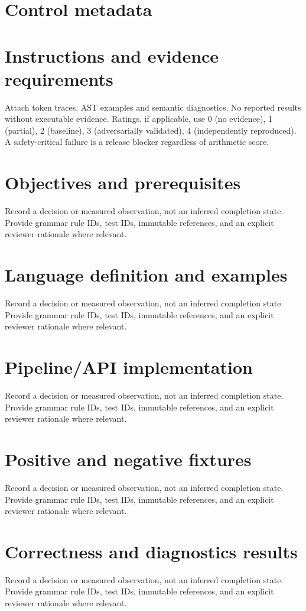 \documentclass[11pt,letterpaper]{article}
\begin{document}
\makedoctitle\makedocsummary
\tableofcontents\clearpage
\section{Control metadata}
\section{Instructions and evidence requirements}
Attach token traces, AST examples and semantic diagnostics. No reported results without executable evidence. Ratings, if applicable, use 0 (no evidence), 1 (partial), 2 (baseline), 3 (adversarially validated), 4 (independently reproduced). A safety-critical failure is a release blocker regardless of arithmetic score.
\section{Objectives and prerequisites}
Record a decision or measured observation, not an inferred completion state. Provide grammar rule IDs, test IDs, immutable references, and an explicit reviewer rationale where relevant.
\section{Language definition and examples}
Record a decision or measured observation, not an inferred completion state. Provide grammar rule IDs, test IDs, immutable references, and an explicit reviewer rationale where relevant.
\section{Pipeline/API implementation}
Record a decision or measured observation, not an inferred completion state. Provide grammar rule IDs, test IDs, immutable references, and an explicit reviewer rationale where relevant.
\section{Positive and negative fixtures}
Record a decision or measured observation, not an inferred completion state. Provide grammar rule IDs, test IDs, immutable references, and an explicit reviewer rationale where relevant.
\section{Correctness and diagnostics results}
Record a decision or measured observation, not an inferred completion state. Provide grammar rule IDs, test IDs, immutable references, and an explicit reviewer rationale where relevant.
\end{document}
